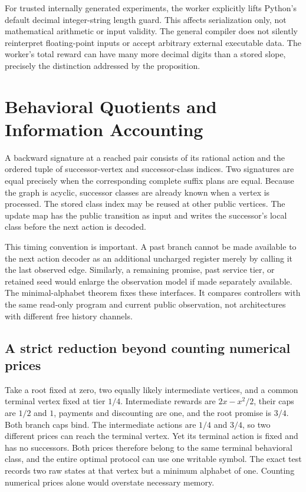 For trusted internally generated experiments, the worker explicitly lifts Python's default decimal integer-string length guard. This affects serialization only, not mathematical arithmetic or input validity. The general compiler does not silently reinterpret floating-point inputs or accept arbitrary external executable data. The worker's total reward can have many more decimal digits than a stored slope, precisely the distinction addressed by the proposition.

\section{Behavioral Quotients and Information Accounting}\label{ec:machine}
A backward signature at a reached pair consists of its rational action and the ordered tuple of successor-vertex and successor-class indices. Two signatures are equal precisely when the corresponding complete suffix plans are equal. Because the graph is acyclic, successor classes are already known when a vertex is processed. The stored class index may be reused at other public vertices. The update map has the public transition as input and writes the successor's local class before the next action is decoded.

This timing convention is important. A past branch cannot be made available to the next action decoder as an additional uncharged register merely by calling it the last observed edge. Similarly, a remaining promise, past service tier, or retained seed would enlarge the observation model if made separately available. The minimal-alphabet theorem fixes these interfaces. It compares controllers with the same read-only program and current public observation, not architectures with different free history channels.

\subsection{A strict reduction beyond counting numerical prices}
Take a root fixed at zero, two equally likely intermediate vertices, and a common terminal vertex fixed at tier $1/4$. Intermediate rewards are $2x-x^2/2$, their caps are $1/2$ and $1$, payments and discounting are one, and the root promise is $3/4$. Both branch caps bind. The intermediate actions are $1/4$ and $3/4$, so two different prices can reach the terminal vertex. Yet its terminal action is fixed and has no successors. Both prices therefore belong to the same terminal behavioral class, and the entire optimal protocol can use one writable symbol. The exact test records two raw states at that vertex but a minimum alphabet of one. Counting numerical prices alone would overstate necessary memory.


